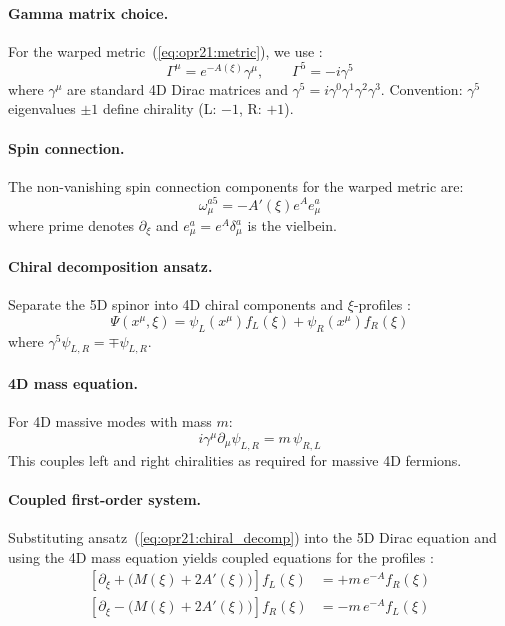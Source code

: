 \paragraph{Gamma matrix choice.}
For the warped metric~(\ref{eq:opr21:metric}), we use \tagM{}:
\begin{equation}
    \Gamma^\mu = e^{-A(\xi)} \gamma^\mu, \qquad \Gamma^5 = -i\gamma^5
\end{equation}
where $\gamma^\mu$ are standard 4D Dirac matrices and $\gamma^5 = i\gamma^0\gamma^1\gamma^2\gamma^3$.
Convention: $\gamma^5$ eigenvalues $\pm 1$ define chirality (L: $-1$, R: $+1$).

\paragraph{Spin connection.}
The non-vanishing spin connection components for the warped metric are:
\begin{equation}
    \omega_\mu^{a5} = -A'(\xi) e^A e_\mu^a
\end{equation}
where prime denotes $\partial_\xi$ and $e_\mu^a = e^A \delta_\mu^a$ is the vielbein.

\paragraph{Chiral decomposition ansatz.}
Separate the 5D spinor into 4D chiral components and $\xi$-profiles \tagDc{}:
\begin{equation}
    \Psi(x^\mu, \xi) = \psi_L(x^\mu) f_L(\xi) + \psi_R(x^\mu) f_R(\xi)
    \label{eq:opr21:chiral_decomp}
\end{equation}
where $\gamma^5 \psi_{L,R} = \mp \psi_{L,R}$.

\paragraph{4D mass equation.}
For 4D massive modes with mass $m$:
\begin{equation}
    i\gamma^\mu \partial_\mu \psi_{L,R} = m\, \psi_{R,L}
\end{equation}
This couples left and right chiralities as required for massive 4D fermions.

\paragraph{Coupled first-order system.}
Substituting ansatz~(\ref{eq:opr21:chiral_decomp}) into the 5D Dirac equation and
using the 4D mass equation yields coupled equations for the profiles \tagDc{}:
\begin{align}
    \left[\partial_\xi + \bigl(M(\xi) + 2A'(\xi)\bigr)\right] f_L(\xi) &= +m\, e^{-A} f_R(\xi)
    \label{eq:opr21:coupled_L} \\
    \left[\partial_\xi - \bigl(M(\xi) + 2A'(\xi)\bigr)\right] f_R(\xi) &= -m\, e^{-A} f_L(\xi)
    \label{eq:opr21:coupled_R}
\end{align}

